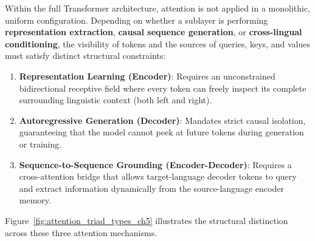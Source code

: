 \documentclass[../../main.tex]{subfiles}
\begin{document}
Within the full Transformer architecture, attention is not applied in a monolithic, uniform configuration. Depending on whether a sublayer is performing \textbf{representation extraction}, \textbf{causal sequence generation}, or \textbf{cross-lingual conditioning}, the visibility of tokens and the sources of queries, keys, and values must satisfy distinct structural constraints:
\begin{enumerate}
    \item \textbf{Representation Learning (Encoder)}: Requires an unconstrained bidirectional receptive field where every token can freely inspect its complete surrounding linguistic context (both left and right).
    \item \textbf{Autoregressive Generation (Decoder)}: Mandates strict causal isolation, guaranteeing that the model cannot peek at future tokens during generation or training.
    \item \textbf{Sequence-to-Sequence Grounding (Encoder-Decoder)}: Requires a cross-attention bridge that allows target-language decoder tokens to query and extract information dynamically from the source-language encoder memory.
\end{enumerate}

Figure~\ref{fig:attention_triad_types_ch5} illustrates the structural distinction across these three attention mechanisms.
\end{document}
